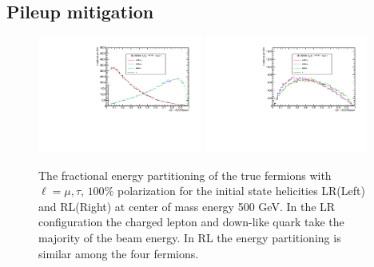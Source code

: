\subsection{Pileup mitigation}
\label{subsec:Pileup_mitigation}
\begin{figure}

\includegraphics[width=0.48\textwidth]{hxLR.pdf}
\includegraphics[width=0.48\textwidth]{hxRL.pdf}
\caption{The fractional energy partitioning of the true fermions with $\ell = \mu,\tau$, $100\%$ polarization for the initial state helicities LR(Left) and RL(Right) at center of mass energy 500 GeV. In the LR configuration the charged lepton and down-like quark take the majority of the beam energy. In RL the energy partitioning is similar among the four fermions. }
\label{fig:Epartition}
\end{figure}


